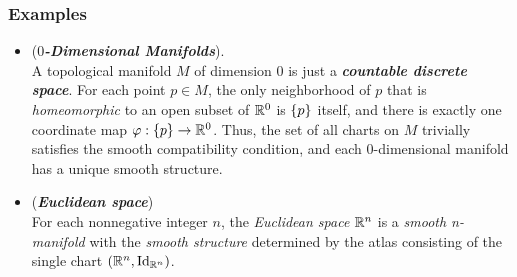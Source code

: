 \documentclass[11pt]{article}
\begin{document}
\subsubsection{Examples}
\begin{itemize}
\item \begin{example} (\emph{\textbf{$0$-Dimensional Manifolds}}). \\
A topological manifold $M$ of dimension $0$ is just a \emph{\textbf{countable discrete space}}. For each point $p \in M$, the only neighborhood of $p$ that is \emph{homeomorphic} to an open subset of ${\mathbb R}^0$ is $\left\{p\right\}$ itself, and there is exactly one coordinate map $\varphi: \left\{p\right\} \rightarrow {\mathbb R}^0$. Thus, the set of all charts on $M$ trivially satisfies the smooth compatibility condition, and each $0$-dimensional manifold has a unique smooth structure.
\end{example}

\item \begin{example} (\emph{\textbf{Euclidean space}})\\
For each nonnegative integer $n$, the \emph{Euclidean space} ${\mathbb R}^n$ is a \emph{smooth n-manifold} with the \emph{smooth structure} determined by the atlas consisting of the single chart $({\mathbb R}^n, \text{Id}_{{\mathbb R}^n})$.
\end{example}


\end{itemize}
\end{document}
